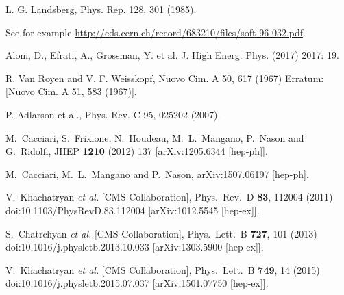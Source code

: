 \documentclass[12pt]{article}
\begin{document}
\begin{thebibliography}{1}

  L. G. Landsberg, Phys. Rep. 128, 301 (1985). 

  See for example \href{http://cds.cern.ch/record/683210/files/soft-96-032.pdf}
{http://cds.cern.ch/record/683210/files/soft-96-032.pdf}.

Aloni, D., Efrati, A., Grossman, Y. et al. J. High Energ. Phys. (2017) 2017: 19. 

  R. Van Royen and V. F. Weisskopf, Nuovo Cim. A 50, 617 (1967) Erratum: [Nuovo Cim. A 51, 583 (1967)].

 P. Adlarson et al., Phys. Rev. C 95, 025202 (2007).

  M.~Cacciari, S.~Frixione, N.~Houdeau, M.~L.~Mangano, P.~Nason and G.~Ridolfi,
  JHEP {\bf 1210} (2012) 137 [arXiv:1205.6344 [hep-ph]].

  M.~Cacciari, M.~L.~Mangano and P.~Nason,
  arXiv:1507.06197 [hep-ph].

  V.~Khachatryan {\it et al.} [CMS Collaboration],
  Phys.\ Rev.\ D {\bf 83}, 112004 (2011)
  doi:10.1103/PhysRevD.83.112004
  [arXiv:1012.5545 [hep-ex]].

  S.~Chatrchyan {\it et al.} [CMS Collaboration],
  Phys.\ Lett.\ B {\bf 727}, 101 (2013)
  doi:10.1016/j.physletb.2013.10.033
  [arXiv:1303.5900 [hep-ex]].

  V.~Khachatryan {\it et al.} [CMS Collaboration],
  Phys.\ Lett.\ B {\bf 749}, 14 (2015)
  doi:10.1016/j.physletb.2015.07.037
  [arXiv:1501.07750 [hep-ex]].



\end{thebibliography}
\end{document}
